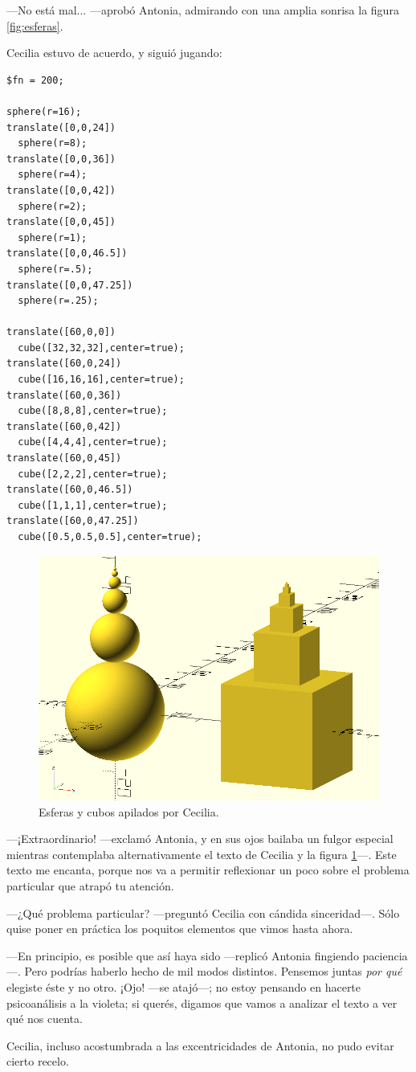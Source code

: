 ---No está mal... ---aprobó Antonia, admirando con una amplia sonrisa
la figura \ref{fig:esferas}.

Cecilia estuvo de acuerdo, y siguió jugando:

    \begin{lstlisting}
$fn = 200;
      
sphere(r=16);
translate([0,0,24])
  sphere(r=8);
translate([0,0,36])
  sphere(r=4);
translate([0,0,42])
  sphere(r=2);
translate([0,0,45])
  sphere(r=1);
translate([0,0,46.5])
  sphere(r=.5);
translate([0,0,47.25])
  sphere(r=.25);

translate([60,0,0])
  cube([32,32,32],center=true);
translate([60,0,24])
  cube([16,16,16],center=true);
translate([60,0,36])
  cube([8,8,8],center=true);
translate([60,0,42])
  cube([4,4,4],center=true);
translate([60,0,45])
  cube([2,2,2],center=true);
translate([60,0,46.5])
  cube([1,1,1],center=true);
translate([60,0,47.25])
  cube([0.5,0.5,0.5],center=true);
    \end{lstlisting}%

    
\begin{figure}[ht]
  \centering
  \includegraphics[width=.9\textwidth]{imagenes/esferas-cubos}
  \caption{Esferas y cubos apilados por Cecilia.}
  \label{fig:esferas-cubos}
\end{figure}


---¡Extraordinario! ---exclamó Antonia, y en sus ojos bailaba un
fulgor especial mientras contemplaba alternativamente el texto de
Cecilia y la figura \ref{fig:esferas-cubos}---. Este texto me encanta,
porque nos va a permitir reflexionar un poco sobre el problema
particular que atrapó tu atención.

---¿Qué problema particular? ---preguntó Cecilia con cándida
sinceridad---. Sólo quise poner en práctica los poquitos elementos que
vimos hasta ahora.

---En principio, es posible que así haya sido ---replicó Antonia
fingiendo paciencia---. Pero podrías haberlo hecho de mil modos
distintos. Pensemos juntas \emph{por qué} elegiste éste y no
otro. ¡Ojo!  ---se atajó---; no estoy pensando en hacerte
psicoanálisis a la violeta; si querés, digamos que vamos a analizar el
texto a ver qué nos cuenta.

Cecilia, incluso acostumbrada a las excentricidades de Antonia, no
pudo evitar cierto recelo.

 

